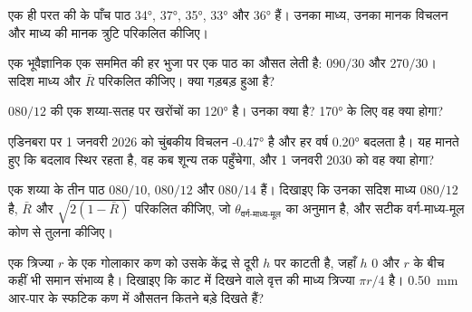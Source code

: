 \begin{exercise}[$\star\star$]\label{exo:b1:field-lab-methods-1:5}
एक ही परत की  के पाँच पाठ \ang{34}, \ang{37}, \ang{35}, \ang{33} और \ang{36} हैं। उनका माध्य, उनका मानक विचलन
और माध्य की मानक त्रुटि परिकलित कीजिए।
\end{exercise}

\begin{exercise}[$\star\star$]\label{exo:b1:field-lab-methods-1:6}
एक भूवैज्ञानिक एक सममित  की हर भुजा पर एक पाठ का औसत लेती है: $090/30$ और $270/30$। सदिश माध्य और $\bar R$
परिकलित कीजिए। क्या गड़बड़ हुआ है?
\end{exercise}

\begin{exercise}[$\star\star$]\label{exo:b1:field-lab-methods-1:7}
 $080/12$ की एक शय्या-सतह पर खरोंचों का  \ang{120} है। उनका  क्या है?  \ang{170} के लिए
वह क्या होगा?
\end{exercise}

\begin{exercise}[$\star\star$]\label{exo:b1:field-lab-methods-1:8}
एडिनबरा पर 1 जनवरी 2026 को चुंबकीय विचलन \ang{-0.47} है और हर वर्ष \ang{+0.20} बदलता है। यह मानते हुए कि बदलाव
स्थिर रहता है, वह कब शून्य तक पहुँचेगा, और 1 जनवरी 2030 को वह क्या होगा?
\end{exercise}

\begin{exercise}[$\star\star$]\label{exo:b1:field-lab-methods-1:9}
एक शय्या के तीन पाठ $080/10$, $080/12$ और $080/14$ हैं। दिखाइए कि उनका सदिश माध्य $080/12$ है, $\bar R$ और
$\sqrt{2(1 - \bar R)}$ परिकलित कीजिए, जो $\theta_{\text{वर्ग-माध्य-मूल}}$ का अनुमान है, और सटीक वर्ग-माध्य-मूल कोण से तुलना कीजिए।
\end{exercise}

\begin{exercise}[$\star\star\star$]\label{exo:b1:field-lab-methods-1:10}
एक  त्रिज्या $r$ के एक गोलाकार कण को उसके केंद्र से दूरी $h$ पर काटती है, जहाँ $h$ 0 और $r$ के बीच कहीं भी
समान संभाव्य है। दिखाइए कि काट में दिखने वाले वृत्त की माध्य त्रिज्या $\pi r/4$ है। \qty{0.50}{mm} आर-पार के स्फटिक
कण  में औसतन कितने बड़े दिखते हैं?
\end{exercise}

